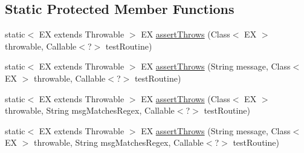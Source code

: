 \subsection*{Static Protected Member Functions}
\begin{DoxyCompactItemize}
\item 
static$<$ EX extends Throwable $>$ EX \mbox{\hyperlink{classtestsuite_1_1x_1_1internal_1_1_internal_x_base_test_case_ac3a1995fd2d670880710f357043eb029}{assert\+Throws}} (Class$<$ EX $>$ throwable, Callable$<$?$>$ test\+Routine)
\item 
static$<$ EX extends Throwable $>$ EX \mbox{\hyperlink{classtestsuite_1_1x_1_1internal_1_1_internal_x_base_test_case_a1e633fc154c97fa3b372584d828b5407}{assert\+Throws}} (String message, Class$<$ EX $>$ throwable, Callable$<$?$>$ test\+Routine)
\item 
static$<$ EX extends Throwable $>$ EX \mbox{\hyperlink{classtestsuite_1_1x_1_1internal_1_1_internal_x_base_test_case_a20fe926d068016aa562d4f828e524c99}{assert\+Throws}} (Class$<$ EX $>$ throwable, String msg\+Matches\+Regex, Callable$<$?$>$ test\+Routine)
\item 
static$<$ EX extends Throwable $>$ EX \mbox{\hyperlink{classtestsuite_1_1x_1_1internal_1_1_internal_x_base_test_case_a3dae21bcf159f4c3e0e5c655bb4f2de8}{assert\+Throws}} (String message, Class$<$ EX $>$ throwable, String msg\+Matches\+Regex, Callable$<$?$>$ test\+Routine)
\end{DoxyCompactItemize}
